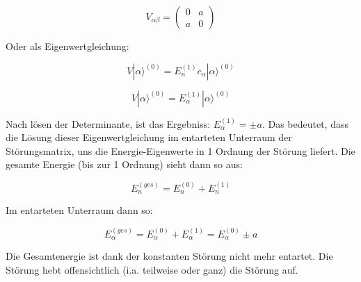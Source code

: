 \[V_{\alpha\beta} = \begin{pmatrix}0&a\\ a&0 \end{pmatrix} \]

Oder als Eigenwertgleichung:


\[V|\alpha\rangle ^{(0)} = E_n^{(1)}c_\alpha|\alpha\rangle ^{(0)}  \]

\[V|\alpha\rangle ^{(0)} = E_\alpha^{(1)} |\alpha\rangle ^{(0)}  \]

Nach lösen der Determinante, ist das Ergebniss:  \(E_\alpha^{(1)} = \pm a \).  Das bedeutet, dass die Lösung dieser Eigenwertgleichung im entarteten Unterraum der Störungsmatrix, uns die Energie-Eigenwerte in 1 Ordnung der Störung liefert. Die gesamte Energie (bis zur 1 Ordnung) sieht dann so aus:

\[E_n^{(ges)} = E_n^{(0)}+E_n^{(1)}\]

Im entarteten Unterraum dann so:

\[E_\alpha^{(ges)} = E_\alpha^{(0)}+E_\alpha^{(1)} =E_\alpha^{(0)}\pm a \]

Die Gesamtenergie ist dank der konstanten Störung nicht mehr entartet. Die Störung hebt offensichtlich (i.a. teilweise oder ganz) die Störung auf.






